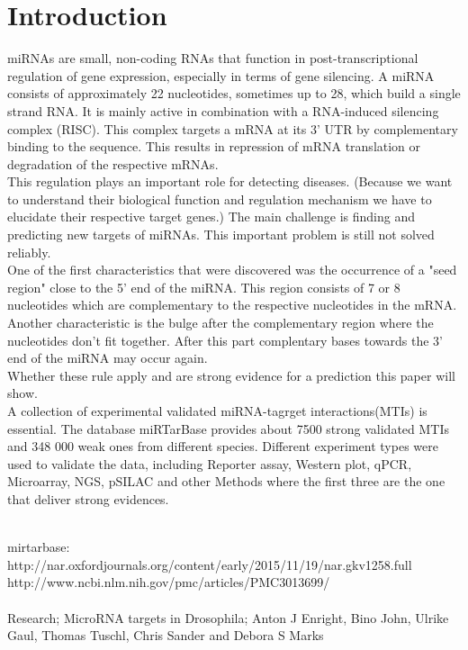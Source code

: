 \documentclass[12pt]{article}
\begin{document}
\tableofcontents

\section{Introduction}

miRNAs are small, non-coding RNAs that function in post-transcriptional regulation of gene expression, especially in terms of gene silencing. A miRNA consists of approximately 22 nucleotides, sometimes up to 28, which build a single strand RNA. It is mainly active in combination with a RNA-induced silencing complex (RISC). This complex targets a mRNA at its 3' UTR by complementary binding to the sequence. This results in repression of mRNA translation or degradation of the respective mRNAs. \\
This regulation plays an important role for detecting diseases.
(Because we want to understand their biological function and regulation mechanism we have to elucidate their respective target genes.)
The main challenge is finding and predicting new targets of miRNAs. This important problem is still not solved reliably.\\
One of the first characteristics that were discovered was the occurrence of a "seed region" close to the 5' end of the miRNA. This region consists of 7 or 8 nucleotides which are complementary to the respective nucleotides in the mRNA. Another characteristic is the bulge after the complementary region where the nucleotides don't fit together. After this part complentary bases towards the 3' end of the miRNA may occur again. \\
Whether these rule apply and are strong evidence for a prediction this paper will show. \\
A collection of experimental validated miRNA-tagrget interactions(MTIs) is essential. The database miRTarBase provides about 7500 strong validated MTIs and 348 000 weak ones from different species. Different experiment types were used to validate the data, including Reporter assay, Western plot, qPCR, Microarray, NGS, pSILAC and other Methods where the first three are the one that deliver strong evidences.

\\

mirtarbase: \\
http://nar.oxfordjournals.org/content/early/2015/11/19/nar.gkv1258.full \\ 

http://www.ncbi.nlm.nih.gov/pmc/articles/PMC3013699/ \\



\\
[1] Research; MicroRNA targets in Drosophila;
Anton J Enright, Bino John, Ulrike Gaul, Thomas Tuschl, Chris Sander and Debora S Marks 
\end{document}
